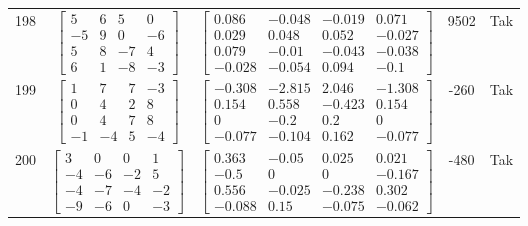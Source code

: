\documentclass[a4paper,12pt]{article}
\begin{document}
\begin{tabular}{c c c c c}
198
&
$\begin{bmatrix} 5 & 6 & 5 & 0 \\ -5 & 9 & 0 & -6 \\ 5 & 8 & -7 & 4 \\ 6 & 1 & -8 & -3 \end{bmatrix}$
&
$\begin{bmatrix} 0.086 & -0.048 & -0.019 & 0.071 \\ 0.029 & 0.048 & 0.052 & -0.027 \\ 0.079 & -0.01 & -0.043 & -0.038 \\ -0.028 & -0.054 & 0.094 & -0.1 \end{bmatrix}$
&
9502
&
Tak
\\
199
&
$\begin{bmatrix} 1 & 7 & 7 & -3 \\ 0 & 4 & 2 & 8 \\ 0 & 4 & 7 & 8 \\ -1 & -4 & 5 & -4 \end{bmatrix}$
&
$\begin{bmatrix} -0.308 & -2.815 & 2.046 & -1.308 \\ 0.154 & 0.558 & -0.423 & 0.154 \\ 0 & -0.2 & 0.2 & 0 \\ -0.077 & -0.104 & 0.162 & -0.077 \end{bmatrix}$
&
-260
&
Tak
\\
200
&
$\begin{bmatrix} 3 & 0 & 0 & 1 \\ -4 & -6 & -2 & 5 \\ -4 & -7 & -4 & -2 \\ -9 & -6 & 0 & -3 \end{bmatrix}$
&
$\begin{bmatrix} 0.363 & -0.05 & 0.025 & 0.021 \\ -0.5 & 0 & 0 & -0.167 \\ 0.556 & -0.025 & -0.238 & 0.302 \\ -0.088 & 0.15 & -0.075 & -0.062 \end{bmatrix}$
&
-480
&
Tak
\\
\end{tabular} \egroup \newpage
\end{document}
